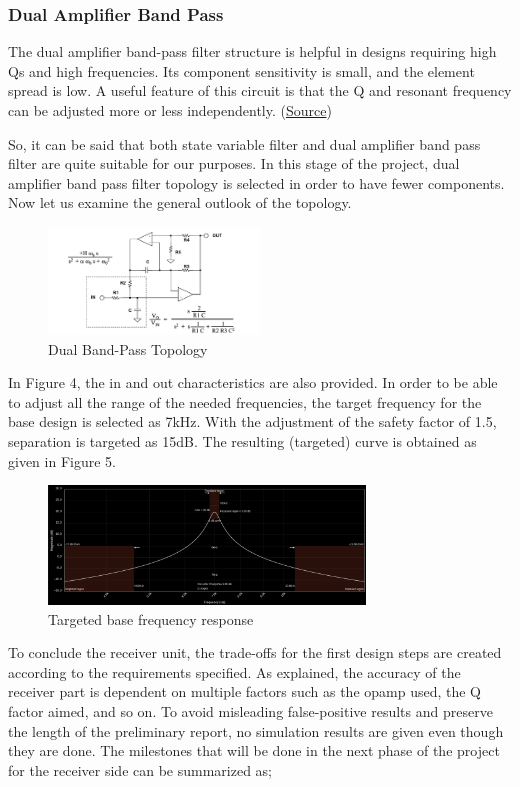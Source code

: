 \documentclass[letterpaper,12pt]{article}
\begin{document}
\subsubsection{Dual Amplifier Band Pass}

The dual amplifier band-pass filter structure is helpful in designs requiring high Qs and high frequencies. Its component sensitivity is small, and the element spread is low. A useful feature of this circuit is that the Q and resonant frequency can be adjusted more or less independently. (\href{https://www.analog.com/media/en/training-seminars/tutorials/MT-209.pdf}{Source})

\vspace{2mm}
So, it can be said that both state variable filter and dual amplifier band pass filter are quite suitable for our purposes. In this stage of the project, dual amplifier band pass filter topology is selected in order to have fewer components. Now let us examine the general outlook of the topology.
\begin{figure}[h]
    \centering
    \includegraphics[width = 0.5\textwidth]{dualbandpass.png}
    \caption{Dual Band-Pass Topology}
\end{figure} 
In Figure 4, the in and out characteristics are also provided. In order to be able to adjust all the range of the needed frequencies, the target frequency for the base design is selected as 7kHz. With the adjustment of the safety factor of 1.5, separation is targeted as 15dB. The resulting (targeted) curve is obtained as given in Figure 5.
\begin{figure}[h]
    \centering
    \includegraphics[width = 0.75\textwidth]{response.png}
    \caption{Targeted base frequency response}
\end{figure} 
To conclude the receiver unit, the trade-offs for the first design steps are created according to the requirements specified. As explained, the accuracy of the receiver part is dependent on multiple factors such as the opamp used, the Q factor aimed, and so on. To avoid misleading false-positive results and preserve the length of the preliminary report, no simulation results are given even though they are done. The milestones that will be done in the next phase of the project for the receiver side can be summarized as;
\end{document}
